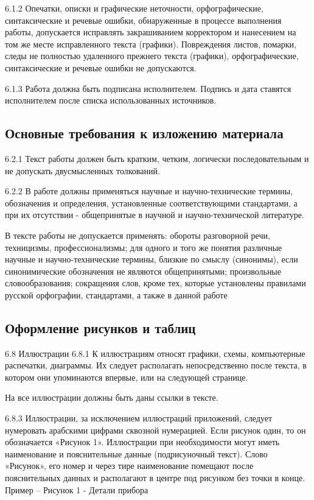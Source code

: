 \documentclass[bachelor, och, coursework, times]{SCWorks}
\begin{document}
6.1.2 Опечатки, описки и графические неточности, орфографические, синтаксические и речевые ошибки, обнаруженные в процессе выполнения работы,
допускается исправлять закрашиванием корректором и нанесением на том же
месте исправленного текста (графики).
Повреждения листов, помарки, следы не полностью удаленного прежнего
текста (графики), орфографические, синтаксические и речевые ошибки не допускаются.

6.1.3 Работа должна быть подписана исполнителем. Подпись и дата ставятся исполнителем после списка использованных источников.

\subsection{Основные требования к изложению материала}

6.2.1 Текст работы должен быть кратким, четким, логически последовательным и не допускать двусмысленных толкований.

6.2.2 В работе должны применяться научные и научно-технические термины,
обозначения и определения, установленные соответствующими стандартами, а
при их отсутствии - общепринятые в научной и научно-технической литературе.

В тексте работы не допускается применять:
обороты разговорной речи, техницизмы, профессионализмы;
для одного и того же понятия различные научные и научно-технические
термины, близкие по смыслу (синонимы), если синонимические обозначения не
являются общепринятыми;
произвольные словообразования;
сокращения слов, кроме тех, которые установлены правилами русской
орфографии, стандартами, а также в данной работе

\subsection{Оформление рисунков и таблиц}

6.8 Иллюстрации
6.8.1 К иллюстрациям относят графики, схемы, компьютерные распечатки, диаграммы. Их следует располагать непосредственно после
текста, в котором они упоминаются впервые, или на следующей странице.

На все иллюстрации должны быть даны ссылки в тексте.

6.8.3 Иллюстрации, за исключением иллюстраций приложений, следует нумеровать арабскими цифрами сквозной нумерацией.
Если рисунок один, то он обозначается «Рисунок 1».
Иллюстрации при необходимости могут иметь наименование и пояснительные данные (подрисуночный текст). Слово «Рисунок», его номер и через тире
наименование помещают после пояснительных данных и располагают в центре
под рисунком без точки в конце.
Пример – Рисунок 1 - Детали прибора
\end{document}
